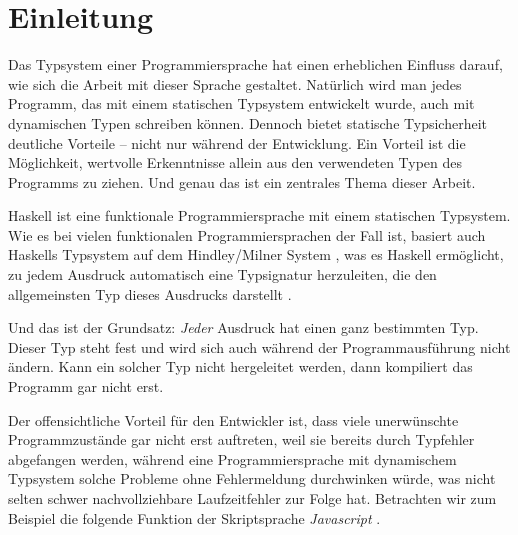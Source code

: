 \section{Einleitung}

\label{sec:einleitung}

Das Typsystem einer Programmiersprache hat einen erheblichen Einfluss darauf, wie sich die Arbeit mit dieser
Sprache gestaltet. Natürlich wird man jedes Programm, das mit einem statischen Typsystem entwickelt wurde,
auch mit dynamischen Typen schreiben können. Dennoch bietet statische Typsicherheit deutliche Vorteile --
nicht nur während der Entwicklung. Ein Vorteil ist die Möglichkeit, wertvolle Erkenntnisse allein aus den verwendeten
Typen des Programms zu ziehen. Und genau das ist ein zentrales Thema dieser Arbeit.

Haskell ist eine funktionale Programmiersprache mit einem statischen Typ\-sys\-tem. Wie es bei vielen funktionalen
Programmiersprachen der Fall ist, basiert auch Haskells Typsystem auf dem Hindley/Milner System \cite{hindley, milner}, was es
Haskell ermöglicht, zu jedem Ausdruck automatisch eine Typsignatur herzuleiten, die den allgemeinsten Typ dieses Ausdrucks
darstellt \cite{wadler}.

Und das ist der Grundsatz: \textit{Jeder} Ausdruck hat einen ganz bestimmten Typ. Dieser Typ steht fest und wird sich auch während der Programmausführung
nicht ändern. Kann ein solcher Typ nicht hergeleitet werden, dann kompiliert das Programm gar nicht erst.

Der offensichtliche Vorteil für den Entwickler ist, dass viele unerwünschte Programmzustände gar nicht erst auftreten,
weil sie bereits durch Typfehler abgefangen werden, während eine Programmiersprache mit dynamischem Typsystem solche
Probleme ohne Fehlermeldung durchwinken würde, was nicht selten schwer nachvollziehbare Laufzeitfehler zur Folge hat.
Betrachten wir zum Beispiel die folgende Funktion der Skriptsprache \textit{Javascript} \cite{javascript}.

